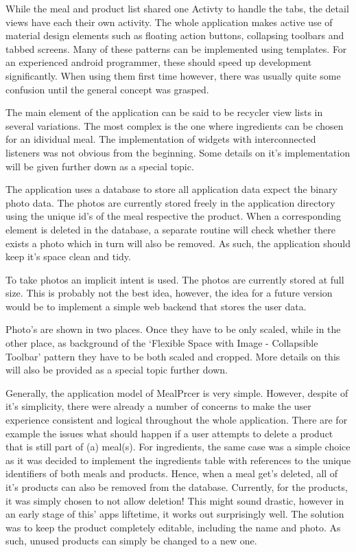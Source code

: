 \documentclass[a4paper,11pt,twoside]{article}
\begin{document}
While the meal and product list shared one Activty to handle the tabs, the detail
views have each their own activity. The whole application makes active use of
material design elements such as floating action buttons, collapsing toolbars
and tabbed screens. Many of these patterns can be implemented using templates. For an
experienced android programmer, these should speed up development significantly.
When using them first time however, there was usually quite some confusion until
the general concept was grasped.

The main element of the application can be said to be recycler view lists in
several variations. The most complex is the one where ingredients can be chosen
for an idividual meal. The implementation of widgets with interconnected listeners
was not obvious from the beginning. Some details on it's implementation will be
given further down as a special topic.

The application uses a database to store all application data expect the binary
photo data. The photos are currently stored freely in the application directory
using the unique id's of the meal respective the product. When a corresponding
element is deleted in the database, a separate routine will check whether there
exists a photo which in turn will also be removed. As such, the application
should keep it's space clean and tidy.

To take photos an implicit intent is used. The photos are currently stored at
full size. This is probably not the best idea, however, the idea for a future
version would be to implement a simple web backend that stores the user data.

Photo's are shown in two places. Once they have to be only scaled, while in the
other place, as background of the `Flexible Space with Image - Collapsible Toolbar'
pattern they have to be both scaled and cropped. More details on this will also be
provided as a special topic further down.

Generally, the application model of MealPrcer is very simple. However, despite of
it's simplicity, there were already a number of concerns to make the user
experience consistent and logical throughout the whole application. There are for
example the issues what should happen if a user attempts to delete a product that
is still part of (a) meal(s). For ingredients, the same case was a simple choice
as it was decided to implement the ingredients table with references to the
unique identifiers of both meals and products. Hence, when a meal get's deleted,
all of it's products can also be removed from the database. Currently, for the
products, it was simply chosen to not allow deletion! This might sound drastic,
however in an early stage of this' apps liftetime, it works out surprisingly
well. The solution was to keep the product completely editable, including the
name and photo. As such, unused products can simply be changed to a new one.
\end{document}
